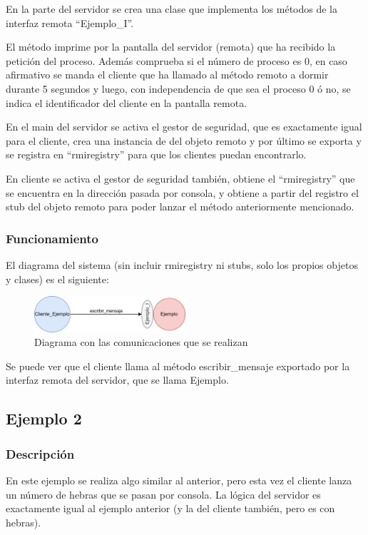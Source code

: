 \documentclass{article}
\begin{document}
\bigskip

En la parte del servidor se crea una clase que implementa los métodos de la interfaz remota ``Ejemplo\_I''.

\bigskip

El método imprime por la pantalla del servidor (remota) que ha recibido la petición del proceso. Además comprueba si el número de proceso es 0, en caso afirmativo se manda el cliente que ha llamado al método remoto a dormir durante 5 segundos y luego, con independencia de que sea el proceso 0 ó no, se indica el identificador del cliente en la pantalla remota.

\bigskip

En el main del servidor se activa el gestor de seguridad, que es exactamente igual para el cliente, crea una instancia de del objeto remoto y por último se exporta y se registra en ``rmiregistry'' para que los clientes puedan encontrarlo.

\bigskip

En cliente se activa el gestor de seguridad también, obtiene el ``rmiregistry'' que se encuentra en la dirección pasada por consola, y obtiene a partir del registro el stub del objeto remoto para poder lanzar el método anteriormente mencionado.


\subsubsection{Funcionamiento}
El diagrama del sistema (sin incluir rmiregistry ni stubs, solo los propios objetos y clases) es el siguiente:

\begin{figure}[H]
    \centering
    \includegraphics[width=0.5\textwidth]{imagenes/E1Diagrama.png}
    \caption{Diagrama con las comunicaciones que se realizan}
\end{figure}

Se puede ver que el cliente llama al método escribir\_mensaje exportado por la interfaz remota del servidor, que se llama Ejemplo.

\subsection{Ejemplo 2}
\subsubsection{Descripción}
En este ejemplo se realiza algo similar al anterior, pero esta vez el cliente lanza un número de hebras que se pasan por consola. La lógica del servidor es exactamente igual al ejemplo anterior (y la del cliente también, pero es con hebras).
\end{document}
